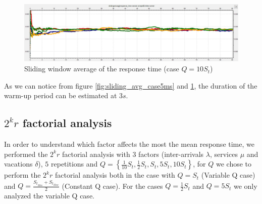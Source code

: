 \documentclass{article}
\begin{document}
        \begin{figure}[ht!]
            \centering
            \includegraphics[scale=0.3]{./images/sliding_window_averages/case50ms.jpg}
            \caption{Sliding window average of the response time (case $Q = 10S_t$)}
            \label{fig:sliding_avg_case50ms}
        \end{figure}
        
        As we can notice from figure \ref{fig:sliding_avg_case5ms} and \ref{fig:sliding_avg_case50ms}, the duration of the warm-up period can be estimated at $3s$.
        
    \newpage
    
    \subsection{$2^k r$ factorial analysis}
    
        In order to understand which factor affects the most the mean response time, we performed the $2^k r$ factorial analysis with $3$ factors (inter-arrivals $\lambda$, services $\mu$ and vacations $\delta$), $5$ repetitions and $Q= \left\{ \frac{1}{10} S_t, \frac{1}{2}S_t, S_t, 5S_t, 10S_t \right\}$, for $Q$ we chose to perform the $2^k r$ factorial analysis both in the case with $Q=S_t$ (Variable Q case) and $Q=\frac{S_{t_{Min}} + S_{t_{Max}}}{2}$ (Constant Q case). For the cases $Q = \frac{1}{2}S_t$ and $Q = 5S_t$ we only analyzed the variable Q case.\\
        
\end{document}
